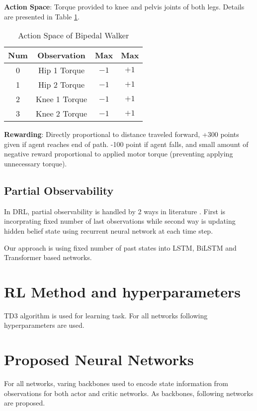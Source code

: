 \textbf{Action Space}: Torque provided to knee and pelvis joints of both legs. Details are presented in Table \ref{table:bpw_act_space}.

\begin{table}[h!]
	\begin{center}
		\begin{tabular}{cccc}
			\textbf{Num} & \textbf{Observation} & \textbf{Max} & \textbf{Max} \\
			\hline
			0  & Hip 1 Torque & $-1$ & $+1$ \\
			1  & Hip 2 Torque & $-1$ & $+1$ \\
			2  & Knee 1 Torque & $-1$ & $+1$ \\
			3  & Knee 2 Torque & $-1$ & $+1$ \\
		\end{tabular}
	\end{center}
	\caption{Action Space of Bipedal Walker}
	\label{table:bpw_act_space}
\end{table}

\textbf{Rewarding}: Directly proportional to distance traveled forward, +300 points given if agent reaches end of path. -100 point if agent falls, and small amount of negative reward proportional to applied motor torque (preventing applying unnecessary torque).

\subsection{Partial Observability}
In DRL, partial observability is handled by 2 ways in literature \cite{dulac-arnold_challenges_2019}. First is incorprating fixed number of last observations while second way is updating hidden belief state using recurrent neural network at each time step. 

Our approach is using fixed number of past states into LSTM, BiLSTM and Transformer based networks. 

\section{RL Method and hyperparameters}
TD3 algorithm is used for learning task. For all networks following hyperparameters are used.

\section{Proposed Neural Networks}

For all networks, varing backbones used to encode state information from observations for both actor and critic networks. As backbones, following networks are proposed.


